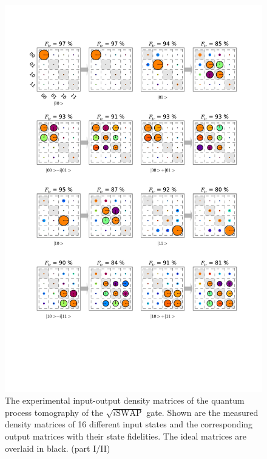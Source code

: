 \begin{figure}[p]
	\centering
		\includegraphics[width=1.0\textwidth]{"./data/ct5/2011_04_21 - grover and tomo/good_data/process -matrices 1"}
	\caption{The experimental input-output density matrices of the quantum process tomography of the $\sqrt{i\mathrm{SWAP}}$ gate. Shown are the measured density matrices of 16 different input states and the corresponding output matrices with their state fidelities. The ideal matrices are overlaid in black. (part I/II)}
	\label{fig:process_matrices_1}
\end{figure}

